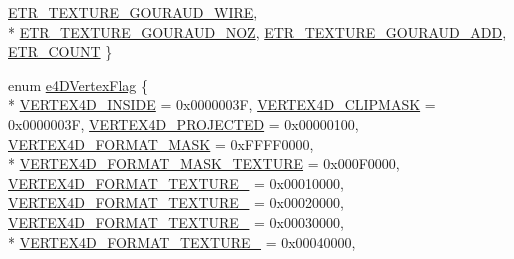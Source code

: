 \begin{DoxyCompactItemize}
\hyperlink{namespaceirr_1_1video_a4511bd8f4f5da6146a7a7f18b64bcecaac4dca1a18ea653f95898846ff21f35ae}{E\-T\-R\-\_\-\-T\-E\-X\-T\-U\-R\-E\-\_\-\-G\-O\-U\-R\-A\-U\-D\-\_\-\-W\-I\-R\-E}, 
\\*
\hyperlink{namespaceirr_1_1video_a4511bd8f4f5da6146a7a7f18b64bcecaa7abc0ed22f4605490741887da77ae62f}{E\-T\-R\-\_\-\-T\-E\-X\-T\-U\-R\-E\-\_\-\-G\-O\-U\-R\-A\-U\-D\-\_\-\-N\-O\-Z}, 
\hyperlink{namespaceirr_1_1video_a4511bd8f4f5da6146a7a7f18b64bcecaadb163d636bbf8da40ca74b1be32c2112}{E\-T\-R\-\_\-\-T\-E\-X\-T\-U\-R\-E\-\_\-\-G\-O\-U\-R\-A\-U\-D\-\_\-\-A\-D\-D}, 
\hyperlink{namespaceirr_1_1video_a4511bd8f4f5da6146a7a7f18b64bcecaa3980615710db3bda315ab478f4d91885}{E\-T\-R\-\_\-\-C\-O\-U\-N\-T}
 \}
\item 
enum \hyperlink{namespaceirr_1_1video_a32d29293d8e68f421868f8d44be884c8}{e4\-D\-Vertex\-Flag} \{ \\*
\hyperlink{namespaceirr_1_1video_a32d29293d8e68f421868f8d44be884c8ad4daa08dd929843ff0fc78a59765d7dc}{V\-E\-R\-T\-E\-X4\-D\-\_\-\-I\-N\-S\-I\-D\-E} = 0x0000003\-F, 
\hyperlink{namespaceirr_1_1video_a32d29293d8e68f421868f8d44be884c8ac5f6b2215fb9245d5c90a194258cf074}{V\-E\-R\-T\-E\-X4\-D\-\_\-\-C\-L\-I\-P\-M\-A\-S\-K} = 0x0000003\-F, 
\hyperlink{namespaceirr_1_1video_a32d29293d8e68f421868f8d44be884c8a95be222e8fdfbd56d8546607e70253e5}{V\-E\-R\-T\-E\-X4\-D\-\_\-\-P\-R\-O\-J\-E\-C\-T\-E\-D} = 0x00000100, 
\hyperlink{namespaceirr_1_1video_a32d29293d8e68f421868f8d44be884c8aa70f5a341cc76b17e91d4c2fb1ca799b}{V\-E\-R\-T\-E\-X4\-D\-\_\-\-F\-O\-R\-M\-A\-T\-\_\-\-M\-A\-S\-K} = 0x\-F\-F\-F\-F0000, 
\\*
\hyperlink{namespaceirr_1_1video_a32d29293d8e68f421868f8d44be884c8a1de13c52e32a7e123c7eec84bc2daa96}{V\-E\-R\-T\-E\-X4\-D\-\_\-\-F\-O\-R\-M\-A\-T\-\_\-\-M\-A\-S\-K\-\_\-\-T\-E\-X\-T\-U\-R\-E} = 0x000\-F0000, 
\hyperlink{namespaceirr_1_1video_a32d29293d8e68f421868f8d44be884c8a37c6e43fd762ddecdc92be723f37239b}{V\-E\-R\-T\-E\-X4\-D\-\_\-\-F\-O\-R\-M\-A\-T\-\_\-\-T\-E\-X\-T\-U\-R\-E\-\_} = 0x00010000, 
\hyperlink{namespaceirr_1_1video_a32d29293d8e68f421868f8d44be884c8a8f1280472061aa9646b785c823d69dd2}{V\-E\-R\-T\-E\-X4\-D\-\_\-\-F\-O\-R\-M\-A\-T\-\_\-\-T\-E\-X\-T\-U\-R\-E\-\_} = 0x00020000, 
\hyperlink{namespaceirr_1_1video_a32d29293d8e68f421868f8d44be884c8a97cb3e311bf8f41b80c27a1b5a8fcaef}{V\-E\-R\-T\-E\-X4\-D\-\_\-\-F\-O\-R\-M\-A\-T\-\_\-\-T\-E\-X\-T\-U\-R\-E\-\_} = 0x00030000, 
\\*
\hyperlink{namespaceirr_1_1video_a32d29293d8e68f421868f8d44be884c8a32f058097adc2b08c2b1dca475b6a587}{V\-E\-R\-T\-E\-X4\-D\-\_\-\-F\-O\-R\-M\-A\-T\-\_\-\-T\-E\-X\-T\-U\-R\-E\-\_} = 0x00040000, 

\end{DoxyCompactItemize}
